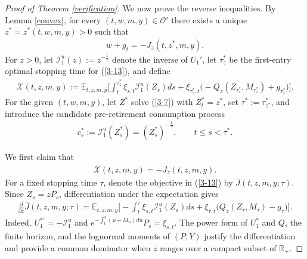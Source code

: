 \documentclass[a4paper,11pt]{amsart}
\numberwithin{equation}{section}
\begin{document}
{\begin{proof}[Proof of Theorem \ref{verification}]
We now prove the reverse inequalities. By Lemma \ref{convex}, for every $(t,w,m,y)\in\mathcal O'$ there exists a unique $z^\ast=z^\ast(t,w,m,y)>0$ such that
\begin{align*}
w+g_t=-J_z(t,z^\ast,m,y).
\end{align*}
For $z>0$, let $\mathcal I_1^u(z):=z^{-\frac{1}{\gamma}}$ denote the inverse of $U_1'$, let $\tau_z^\ast$ be the first-entry optimal stopping time for (\ref{3-13}), and define
\begin{align*}
\overline{\mathcal X}(t,z,m,y):=\mathbb E_{t,z,m,y}\bigg[\int_t^{\tau_z^\ast}\xi_{s,t}\mathcal I_1^u(Z_s)ds+\xi_{\tau_z^\ast,t}\big(-Q_z(Z_{\tau_z^\ast},M_{\tau_z^\ast})+g_{\tau_z^\ast}\big)\bigg].
\end{align*}
For the given $(t,w,m,y)$, let $Z^\ast$ solve (\ref{3-7}) with $Z_t^\ast=z^\ast$, set $\tau^\ast:=\tau_{z^\ast}^\ast$, and introduce the candidate pre-retirement consumption process
\begin{align*}
c_s^\ast:=\mathcal I_1^u(Z_s^\ast)=(Z_s^\ast)^{-\frac{1}{\gamma}},\qquad t\leq s<\tau^\ast.
\end{align*}

We first claim that
\begin{align*}
\overline{\mathcal X}(t,z,m,y)=-J_z(t,z,m,y).
\end{align*}
For a fixed stopping time $\tau$, denote the objective in (\ref{3-13}) by $\overline J(t,z,m,y;\tau)$. Since $Z_s=zP_s$, differentiation under the expectation gives
\begin{align}\label{envelopederivative}
\frac{\partial}{\partial z}\overline J(t,z,m,y;\tau)
=\mathbb E_{t,z,m,y}\bigg[-\int_t^\tau\xi_{s,t}\mathcal I_1^u(Z_s)ds+\xi_{\tau,t}\big(Q_z(Z_\tau,M_\tau)-g_\tau\big)\bigg].
\end{align}
Indeed, $U_1^{\ast\prime}=-\mathcal I_1^u$ and $e^{-\int_t^s(\rho+M_u)du}P_s=\xi_{s,t}$. The power form of $U_1^\ast$ and $Q$, the finite horizon, and the lognormal moments of $(P,Y)$ justify the differentiation and provide a common dominator when $z$ ranges over a compact subset of $\mathbb R_+$.


\end{proof}}
\end{document}
